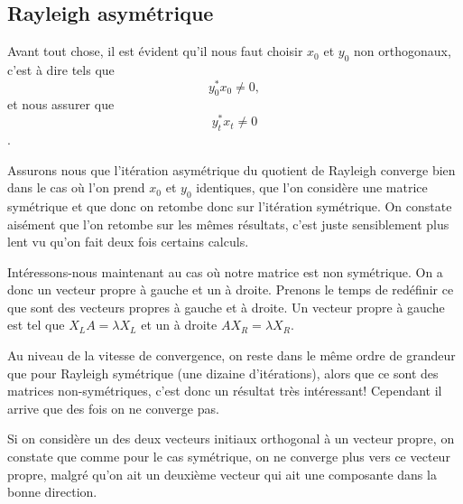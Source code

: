 
\subsection*{Rayleigh asymétrique}

	Avant tout chose, il est évident qu'il nous faut choisir $x_0$ et $y_0$ non orthogonaux, c'est à dire tels que $$y_0^* x_0 \neq 0,$$ et nous assurer que $$y_t^* x_t \neq 0$$.
	
	Assurons nous que l'itération asymétrique du quotient de Rayleigh converge bien dans le cas où l'on prend $x_0$ et $y_0$ identiques, que l'on considère une matrice symétrique et que donc on retombe donc sur l'itération symétrique. On constate aisément que l'on retombe sur les mêmes résultats, c'est juste sensiblement plus lent vu qu'on fait deux fois certains calculs. 
	
	Intéressons-nous maintenant au cas où notre matrice est non symétrique. On a donc un vecteur propre à gauche et un à droite. Prenons le temps de redéfinir ce que sont des vecteurs propres à gauche et à droite. Un vecteur propre à gauche est tel que $X_L A = \lambda X_L$ et un à droite $A X_R = \lambda X_R$. 
	
	Au niveau de la vitesse de convergence, on reste dans le même ordre de grandeur que pour Rayleigh symétrique  (une dizaine d'itérations), alors que ce sont des matrices non-symétriques, c'est donc un résultat très intéressant! Cependant il arrive que des fois on ne converge pas. 
	
	Si on considère un des deux vecteurs initiaux orthogonal à un vecteur propre, on constate que comme pour le cas symétrique, on ne converge plus vers ce vecteur propre, malgré qu'on ait un deuxième vecteur qui ait une composante dans la bonne direction.   
	
